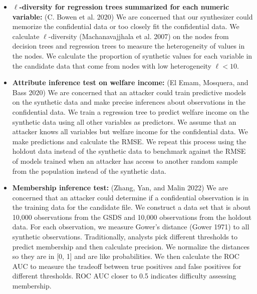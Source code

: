 \documentclass[
]{urban-formatting}
\begin{document}
\begin{itemize}
\item
  \textbf{\(\ell\)-diversity for regression trees summarized for each
  numeric variable:} (C. Bowen et al. 2020) We are concerned that our
  synthesizer could memorize the confidential data or too closely fit
  the confidential data. We calculate \(\ell\)-diversity
  (Machanavajjhala et al. 2007) on the nodes from decision trees and
  regression trees to measure the heterogeneity of values in the nodes.
  We calculate the proportion of synthetic values for each variable in
  the candidate data that come from nodes with low heterogeneity
  \(\ell < 10\).
\item
  \textbf{Attribute inference test on welfare income:} (El Emam,
  Mosquera, and Bass 2020) We are concerned that an attacker could train
  predictive models on the synthetic data and make precise inferences
  about observations in the confidential data. We train a regression
  tree to predict welfare income on the synthetic data using all other
  variables as predictors. We assume that an attacker knows all
  variables but welfare income for the confidential data. We make
  predictions and calculate the RMSE. We repeat this process using the
  holdout data instead of the synthetic data to benchmark against the
  RMSE of models trained when an attacker has access to another random
  sample from the population instead of the synthetic data.
\item
  \textbf{Membership inference test:} (Zhang, Yan, and Malin 2022) We
  are concerned that an attacker could determine if a confidential
  observation is in the training data for the candidate file. We
  construct a data set that is about 10,000 observations from the GSDS
  and 10,000 observations from the holdout data. For each observation,
  we measure Gower's distance (Gower 1971) to all synthetic
  observations. Traditionally, analysts pick different thresholds to
  predict membership and then calculate precision. We normalize the
  distances so they are in {[}0, 1{]} and are like probabilities. We
  then calculate the ROC AUC to measure the tradeoff between true
  positives and false positives for different thresholds. ROC AUC closer
  to 0.5 indicates difficulty assessing membership.
\end{itemize}






\end{document}
